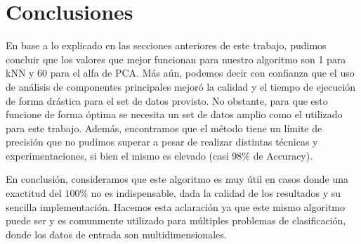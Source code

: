 \section{Conclusiones}

En base a lo explicado en las secciones anteriores de este trabajo, pudimos concluir que los valores que mejor funcionan para nuestro algoritmo son 1 para kNN y 60 para el alfa de PCA. Más aún, podemos decir con confianza que el uso de análisis de componentes principales mejoró la calidad y el tiempo de ejecución de forma drástica para el set de datos provisto. No obstante, para que esto funcione de forma óptima se necesita un set de datos amplio como el utilizado para este trabajo. Además, encontramos que el método tiene un límite de precisión que no pudimos superar a pesar de realizar distintas técnicas y experimentaciones, si bien el mismo es elevado (casi 98\% de Accuracy).

En conclusión, consideramos que este algoritmo es muy útil en casos donde una exactitud del $100\%$ no es indispensable, dada la calidad de los resultados y su sencilla implementación. Hacemos esta aclaración ya que este mismo algoritmo puede ser y es comunmente utilizado para múltiples problemas de clasificación, donde los datos de entrada son multidimensionales.
